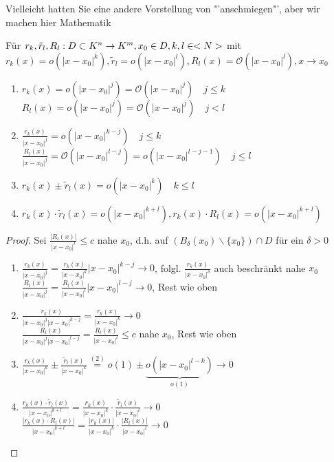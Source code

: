 \smiley{} Vielleicht hatten Sie eine andere Vorstellung von "'anschmiegen"', aber wir machen hier 
Mathematik \smiley{}

\begin{proposition}
	Für $r_k,\tilde{r}_l,R_l:D\subset K^n\to K^m,x_0\in D,k,l\in<N>$ mit \\
	$r_k(x)=o(\vert x-x_0\vert^k),\tilde{r}_l=o(\vert x-x_0\vert^l),R_l(x)=\mathcal{O}(\vert x-x_0\vert ^l),x\to x_0$
	\begin{enumerate}
		\item $r_k(x)=o(\vert x-x_0\vert^j)=\mathcal{O}(\vert x-x_0\vert^j)\quad j\le k$ \\
		$R_l(x)=o(\vert x-x_0\vert^j)=\mathcal{O}(\vert x-x_0\vert^j)\quad j<l$
		\item $\frac{r_k(x)}{\vert x-x_0\vert^j}=o(\vert x-x_0\vert^{k-j})\quad j\le k$ \\
		$\frac{R_l(x)}{\vert x-x_0\vert^j}=\mathcal{O}(\vert x-x_0\vert^{l-j})=o(\vert x-x_0\vert^{l-j-1})\quad j\le l$
		\item $r_k(x)\pm \tilde{r}_l(x)=o(\vert x-x_0\vert ^k)\quad k\le l$
		\item $r_k(x)\cdot \tilde{r}_l(x)=o(\vert x-x_0\vert^{k+l}),r_k(x)\cdot R_l(x)=o(\vert x-x_0\vert^{k+l})$
	\end{enumerate}
\end{proposition}
\begin{proof}
	Sei $\frac{\vert R_l(x)\vert}{\vert x-x_0\vert^l}\le c$ nahe $x_0$, d.h. auf $(B_{\delta}(x_0)\backslash\{x_0\})\cap D$ für ein $\delta>0$
	\begin{enumerate}
		\item $\frac{r_k(x)}{\vert x-x_0\vert^j}=\frac{r_k(x)}{\vert x-x_0\vert^k}\vert x-x_0\vert^{k-j}\to 0$, folgl. $\frac{r_k(x)}{\vert x-x_0\vert^{\delta}}$ auch beschränkt nahe $x_0$ \\
		$\frac{R_l(x)}{\vert  x-x_0\vert^j}=\frac{R_l(x)}{\vert x-x_0\vert^l}\vert x-x_0\vert^{l-j}\to 0$, Rest wie oben
		\item $\frac{r_k(x)}{\vert x-x_0\vert^j \vert x-x_0\vert^{k-j}}=\frac{r_k(x)}{\vert x-x_0\vert^k}\to 0$ \\
		$\frac{R_l(x)}{\vert x-x_0\vert^j \vert x-x_0\vert^{l-j}}=\frac{R_l(x)}{\vert x-x_0\vert^l}\le c$ nahe $x_0$, Rest wie oben
		\item $\frac{r_k(x)}{\vert x-x_0\vert^k}\pm\frac{\tilde{r}_l(x)}{\vert x-x_0\vert^k}\overset{(2)}{=}o(1)\pm\underbrace{o(\vert x-x_0\vert^{l-k})}_{o(1)}\to 0$
		\item $\frac{r_k(x)\cdot \tilde{r}_l(x)}{\vert x-x_0\vert^{k+l}}=\frac{r_k(x)}{\vert x-x_0\vert^k}\cdot\frac{\tilde{r}_l(x)}{\vert x-x_0\vert^l}\to 0$ \\
		$\frac{\vert r_k(x)\cdot R_l(x)\vert}{\vert x-x_0\vert^{k+l}}=\frac{\vert r_k(x)\vert}{\vert x-x_0\vert^k}\cdot\frac{\vert R_l(x)\vert}{\vert x-x_0\vert^l}\to 0$
	\end{enumerate}
\end{proof}

